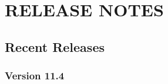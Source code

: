\documentclass{report}
\begin{document}
\chapter{\label{CHP:CHANG}RELEASE NOTES}


\section{\label{SEC:CURRENT}Recent Releases}





\subsection{\label{SSEC:VER_11.4}Version 11.4}
\end{document}
